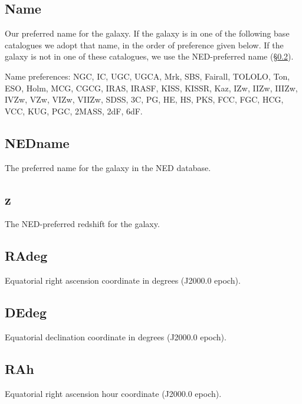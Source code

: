 \documentclass[twocolumn,tighten]{aastex62}
\begin{document}
\subsection{Name} \label{Name}
Our preferred name for the galaxy. If the galaxy is in one of the following base catalogues we adopt that name, in the order of preference given below. If the galaxy is not in one of these catalogues, we use the NED-preferred name (\S \ref{NEDname}).

Name preferences: NGC, IC, UGC, UGCA, Mrk, SBS, Fairall, TOLOLO, Ton, ESO, Holm, MCG, CGCG, IRAS, IRASF, KISS, KISSR, Kaz, IZw, IIZw, IIIZw, IVZw, VZw, VIZw, VIIZw, SDSS, 3C, PG, HE, HS, PKS, FCC, FGC, HCG, VCC, KUG, PGC, 2MASS, 2dF, 6dF.



\subsection{NEDname} \label{NEDname}
The preferred name for the galaxy in the NED database.

\subsection{z} \label{z}
The NED-preferred redshift for the galaxy. 

\subsection{RAdeg} \label{RAdeg}
Equatorial right ascension coordinate in degrees (J2000.0 epoch).

\subsection{DEdeg} \label{DEdeg}
Equatorial declination coordinate in degrees (J2000.0 epoch).

\subsection{RAh} \label{RAh}
Equatorial right ascension hour coordinate (J2000.0 epoch).
\end{document}
